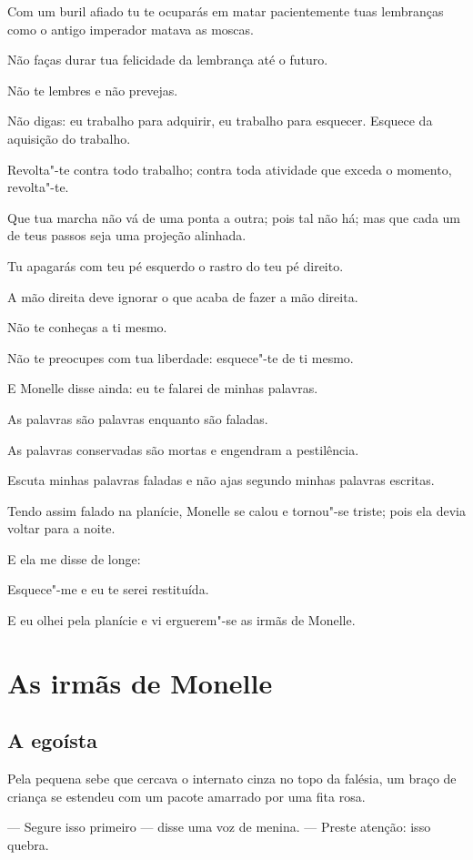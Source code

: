 Com um buril afiado tu te ocuparás em matar pacientemente tuas
lembranças como o antigo imperador matava as moscas.

Não faças durar tua felicidade da lembrança até o futuro.

Não te lembres e não prevejas.

Não digas: eu trabalho para adquirir, eu trabalho para esquecer.
Esquece da aquisição do trabalho.

Revolta"-te contra todo trabalho; contra toda atividade que exceda o
momento, revolta"-te.

Que tua marcha não vá de uma ponta a outra; pois tal não há; mas que
cada um de teus passos seja uma projeção alinhada.

Tu apagarás com teu pé esquerdo o rastro do teu pé direito.

A mão direita deve ignorar o que acaba de fazer a mão direita.

Não te conheças a ti mesmo.

Não te preocupes com tua liberdade: esquece"-te de ti mesmo.

E Monelle disse ainda: eu te falarei de minhas palavras.

As palavras são palavras enquanto são faladas.

As palavras conservadas são mortas e engendram a pestilência.

Escuta minhas palavras faladas e não ajas segundo minhas palavras
escritas.

Tendo assim falado na planície, Monelle se calou e tornou"-se triste;
pois ela devia voltar para a noite.

E ela me disse de longe:

Esquece"-me e eu te serei restituída.

E eu olhei pela planície e vi erguerem"-se as irmãs de Monelle.


\chapter{As irmãs de Monelle}

\section*{A egoísta}

Pela pequena sebe que cercava o internato cinza no topo da falésia, um
braço de criança se estendeu com um pacote amarrado por uma fita rosa.

--- Segure isso primeiro --- disse uma voz de menina. --- Preste atenção: isso
quebra.

